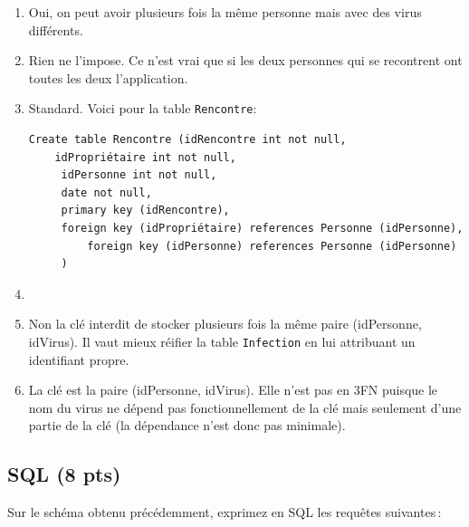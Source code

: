    
\begin{solution}
 \begin{enumerate}
    \item Oui, on peut avoir plusieurs fois la même
       personne mais avec des virus différents.
     \item Rien ne l'impose. Ce n'est vrai que si  
        les deux personnes qui se recontrent ont toutes
        les deux l'application.
     \item Standard. Voici pour la table \texttt{Rencontre}:
     
\begin{verbatim}
Create table Rencontre (idRencontre int not null, 
    idPropriétaire int not null, 
     idPersonne int not null, 
     date not null,
     primary key (idRencontre),
     foreign key (idPropriétaire) references Personne (idPersonne),
         foreign key (idPersonne) references Personne (idPersonne)
     )
\end{verbatim}
     
     \item 
     
     \item Non la clé interdit de stocker plusieurs
       fois la même paire (idPersonne, idVirus).
       Il vaut mieux réifier la table \texttt{Infection}
       en lui attribuant un identifiant propre.
     \item La clé est la paire (idPersonne, idVirus).
     Elle n'est pas en 3FN puisque le nom du virus
     ne dépend pas fonctionnellement de la clé 
     mais seulement d'une partie de la clé (la dépendance
     n'est donc pas minimale).
 \end{enumerate}
 
\end{solution}


\subsection*{SQL (8 pts)}

Sur le schéma obtenu précédemment, exprimez en SQL les requêtes suivantes\,:

